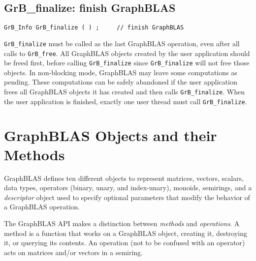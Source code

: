 \documentclass[12pt]{article}
\begin{document}
\subsection{{\sf GrB\_finalize:} finish GraphBLAS} %
\label{finalize}

\begin{mdframed}[userdefinedwidth=6in]
{\footnotesize
\begin{verbatim}
GrB_Info GrB_finalize ( ) ;     // finish GraphBLAS
\end{verbatim}
}\end{mdframed}

\verb'GrB_finalize' must be called as the last GraphBLAS operation, even after
all calls to \verb'GrB_free'.  All GraphBLAS objects created by the user
application should be freed first, before calling \verb'GrB_finalize' since
\verb'GrB_finalize' will not free those objects.  In non-blocking mode,
GraphBLAS may leave some computations as pending.  These computations can be
safely abandoned if the user application frees all GraphBLAS objects it has
created and then calls \verb'GrB_finalize'.  When the user application is
finished, exactly one user thread must call \verb'GrB_finalize'.

\newpage
\section{GraphBLAS Objects and their Methods} %
\label{objects}

GraphBLAS defines ten different objects to represent matrices, vectors,
scalars, data types, operators (binary, unary, and index-unary), monoids,
semirings, and a {\em descriptor} object used to specify optional parameters
that modify the behavior of a GraphBLAS operation.

The GraphBLAS API makes a distinction between {\em methods} and {\em
operations}.  A method is a function that works on a GraphBLAS object, creating
it, destroying it, or querying its contents.  An operation (not to be confused
with an operator) acts on matrices and/or vectors in a semiring.
\end{document}
